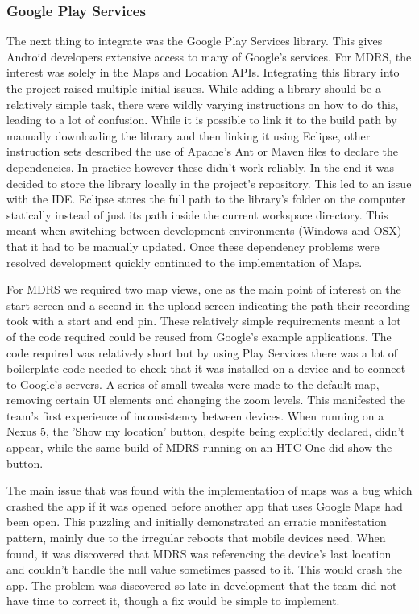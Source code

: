 \documentclass{l3proj}
\begin{document}
\subsubsection{Google Play Services}    The next thing to integrate was the Google Play Services library. This gives Android developers extensive access to many of Google's services. For MDRS, the interest was solely in the Maps and Location APIs. Integrating this library into the project raised multiple initial issues. While adding a library should be a relatively simple task, there were wildly varying instructions on how to do this, leading to a lot of confusion. While it is possible to link it to the build path by manually downloading the library and then linking it using Eclipse, other instruction sets described the use of Apache's Ant or Maven files to declare the dependencies. In practice however these didn't work reliably. In the end it was decided to store the library locally in the project's repository. This led to an issue with the IDE. Eclipse stores the full path to the library's folder on the computer statically instead of just its path inside the current workspace directory. This meant when switching between development environments (Windows and OSX) that it had to be manually updated. Once these dependency problems were resolved development quickly continued to the implementation of Maps.

For MDRS we required two map views, one as the main point of interest on the start screen and a second in the upload screen indicating the path their recording took with a start and end pin. These relatively simple requirements meant a lot of the code required could be reused from Google's example applications. The code required was relatively short but by using Play Services there was a lot of boilerplate code needed to check that it was installed on a device and to connect to Google's servers. A series of small tweaks were made to the default map, removing certain UI elements and changing the zoom levels. This manifested the team's first experience of inconsistency between devices. When running on a Nexus 5, the 'Show my location' button, despite being explicitly declared, didn't appear, while the same build of MDRS running on an HTC One did show the button.

The main issue that was found with the implementation of maps was a bug which crashed the app if it was opened before another app that uses Google Maps had been open. This puzzling and initially demonstrated an erratic manifestation pattern, mainly due to the irregular reboots that mobile devices need. When found, it was discovered that MDRS was referencing the device's last location and couldn't handle the null value sometimes passed to it. This would crash the app. The problem was discovered so late in development that the team did not have time to correct it, though a fix would be simple to implement.
\end{document}
